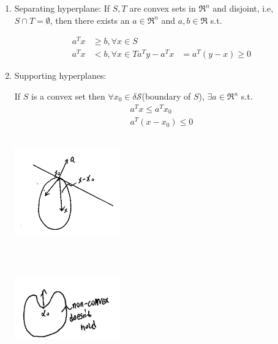 \begin{enumerate}
	\item Separating hyperplane: If $S,T$ are convex sets in $\Re^n$ and disjoint, i.e, $S\cap T = \emptyset$, then there exists an $a \in \Re^n$ and $a,b\in \Re$ s.t.
	
	\begin{align*}
	a^Tx&\geq b, \forall x\in S\\
	a^Tx &<b, \forall x\in T
	a^Ty - a^Tx &= a^T(y-x) \geq 0
	\end{align*}
	
	\item Supporting hyperplanes:
	
	If $S$ is a convex set then $\forall x_0\in \delta \mathcal{S}$(boundary of $S$), $\exists a\in \Re^n$ s.t. 
	\begin{align*}
	a^Tx \leq a^Tx_0\\
	a^T(x - x_0)\leq 0
	\end{align*}
	
	\begin{marginfigure}
	\centering
	\includegraphics[width=1.8in,height=1.8in]{figures/ch08/figure1030_3.png}
	\end{marginfigure}
	
	\begin{marginfigure}
	\centering
	\includegraphics[width=1.8in,height=1.8in]{figures/ch08/figure1030_4.png}
	\end{marginfigure}
	

\end{enumerate}
